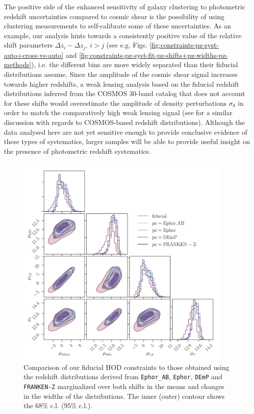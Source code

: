 \documentclass[a4paper,11pt]{article}
\begin{document}
      The positive side of the enhanced sensitivity of galaxy clustering to photometric redshift uncertainties compared to cosmic shear is the possibility of using clustering measurements to self-calibrate some of these uncertainties. As an example, our analysis hints towards a consistently positive value of the relative shift parameters $\Delta z_i-\Delta z_j,\,i>j$ (see e.g. Figs. \ref{fig:constraints-pz-syst-auto+cross-vs-auto} and \ref{fig:constraints-pz-syst-fit-pz-shifts+pz-widths-pz-methods}), i.e. the different bins are more widely separated than their fiducial distributions assume. Since the amplitude of the cosmic shear signal increases towards higher redshifts, a weak lensing analysis based on the fiducial redshift distributions inferred from the COSMOS 30-band catalog that does not account for these shifts would overestimate the amplitude of density perturbations $\sigma_8$ in order to match the comparatively high weak lensing signal (see \cite{2019arXiv190609262J} for a similar discussion with regards to COSMOS-based redshift distributions). Although the data analysed here are not yet sensitive enough to provide conclusive evidence of these types of systematics, larger samples will be able to provide useful insight on the presence of photometric redshift systematics.
      \begin{figure}
        \begin{center}
          \includegraphics[width=0.95\textwidth]{figures/contours-Mmin-M1_mPk=HOD_fix=alpha-fc-sigmaM_HOD=zevol_fit=pz-shifts-pz-widths+prior=0p2_fit=auto+cross_cosmo=const_HOD-param=zfid_clfit=HOD-zevol_pz-methods.pdf}
          \caption{Comparison of our fiducial HOD constraints to those obtained using the redshift distributions derived from \texttt{Ephor\_AB}, \texttt{Ephor}, \texttt{DEmP} and \texttt{FRANKEN-Z} marginalized over both shifts in the means and changes in the widths of the distributions. The inner (outer) contour shows the $68 \%$ c.l. ($95 \%$ c.l.).}
          \label{fig:constraints-HOD-fit-pz-shifts+pz-widths-pz-methods}
        \end{center}
      \end{figure}
 
\end{document}
